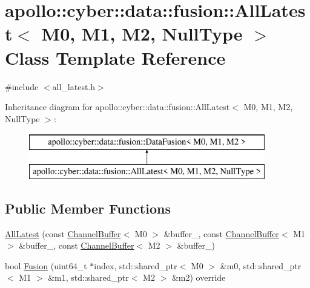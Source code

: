 \hypertarget{classapollo_1_1cyber_1_1data_1_1fusion_1_1AllLatest_3_01M0_00_01M1_00_01M2_00_01NullType_01_4}{\section{apollo\-:\-:cyber\-:\-:data\-:\-:fusion\-:\-:All\-Latest$<$ M0, M1, M2, Null\-Type $>$ Class Template Reference}
\label{classapollo_1_1cyber_1_1data_1_1fusion_1_1AllLatest_3_01M0_00_01M1_00_01M2_00_01NullType_01_4}
}


{\ttfamily \#include $<$all\-\_\-latest.\-h$>$}

Inheritance diagram for apollo\-:\-:cyber\-:\-:data\-:\-:fusion\-:\-:All\-Latest$<$ M0, M1, M2, Null\-Type $>$\-:\begin{figure}[H]
\begin{center}
\leavevmode
\includegraphics[height=2.000000cm]{classapollo_1_1cyber_1_1data_1_1fusion_1_1AllLatest_3_01M0_00_01M1_00_01M2_00_01NullType_01_4}
\end{center}
\end{figure}
\subsection*{Public Member Functions}
\begin{DoxyCompactItemize}
\item 
\hyperlink{classapollo_1_1cyber_1_1data_1_1fusion_1_1AllLatest_3_01M0_00_01M1_00_01M2_00_01NullType_01_4_aab8f0ed8723d141f268d9a975005ba17}{All\-Latest} (const \hyperlink{classapollo_1_1cyber_1_1data_1_1ChannelBuffer}{Channel\-Buffer}$<$ M0 $>$ \&buffer\-\_, const \hyperlink{classapollo_1_1cyber_1_1data_1_1ChannelBuffer}{Channel\-Buffer}$<$ M1 $>$ \&buffer\-\_, const \hyperlink{classapollo_1_1cyber_1_1data_1_1ChannelBuffer}{Channel\-Buffer}$<$ M2 $>$ \&buffer\-\_)
\item 
bool \hyperlink{classapollo_1_1cyber_1_1data_1_1fusion_1_1AllLatest_3_01M0_00_01M1_00_01M2_00_01NullType_01_4_a7929bf92d377a90ad90978665710807b}{Fusion} (uint64\-\_\-t $\ast$index, std\-::shared\-\_\-ptr$<$ M0 $>$ \&m0, std\-::shared\-\_\-ptr$<$ M1 $>$ \&m1, std\-::shared\-\_\-ptr$<$ M2 $>$ \&m2) override
\end{DoxyCompactItemize}
